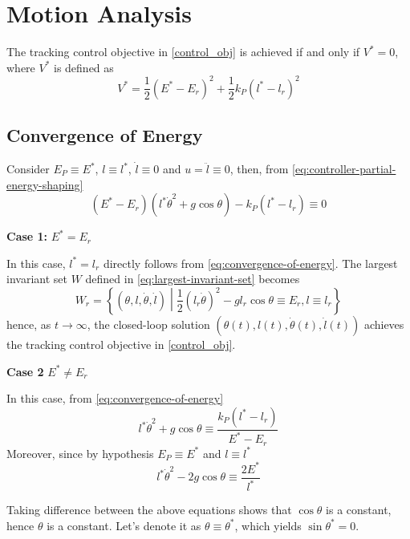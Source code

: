 \documentclass[main.tex]{subfiles}
\begin{document}
\section{Motion Analysis}
\label{sec:motion-analysis}
The tracking control objective in \eqref{control_obj} is 
achieved if and only if $V^* = 0$, where $V^*$ is defined as
\begin{equation}
  V^* = \frac{1}{2}(E^*-E_r)^2+\frac{1}{2}k_P(l^*-l_r)^2
\end{equation}
\subsection{Convergence of Energy}
\label{subsec:convergence-of-energy}
Consider $E_P \equiv E^*$, $l \equiv l^*$, $\dot{l} \equiv 0$ and $u = \ddot{l} \equiv 0$, then, from
\eqref{eq:controller-partial-energy-shaping}
\begin{equation}
  \label{eq:convergence-of-energy}
  (E^*-E_r)(l^*\dot{\theta}^2+g\cos\theta)-k_P(l^*-l_r) \equiv 0
\end{equation}

\noindent \textbf{Case 1:} $E^* = E_r$

In this case, $l^* = l_r$ directly follows from 
\eqref{eq:convergence-of-energy}. The largest invariant set $W$
defined in \eqref{eq:largest-invariant-set} becomes
\begin{equation}
  \label{eq:def-Wr}
  W_r = \left\{ (\theta, l, \dot{\theta}, \dot{l})
    \middle| \frac{1}{2} (l_r \dot{\theta})^2 -
    g l_r \cos\theta \equiv E_r, l \equiv l_r \right\}
\end{equation}
hence, as $t \to \infty$, the closed-loop solution
$(\theta(t), l(t), \dot{\theta}(t), \dot{l}(t))$ achieves the
tracking control objective in \eqref{control_obj}.

\noindent \textbf{Case 2} $E^* \neq E_r$

In this case, from \eqref{eq:convergence-of-energy}
\begin{equation}
  l^* \dot{\theta}^2 + g\cos\theta \equiv 
  \frac{k_P(l^*-l_r)}{E^*-E_r}
\end{equation}
Moreover, since by hypothesis $E_P \equiv E^*$ and $l 
\equiv l^*$
\begin{equation}
  l^* \dot{\theta}^2 - 2g\cos\theta \equiv \frac{2E^*}{l^*}
\end{equation}

Taking difference between the above equations shows that
$\cos\theta$ is a constant, hence $\theta$ is a constant.
Let's denote it as $\theta \equiv \theta^*$, which yields
$\sin\theta^*=0$.
\end{document}
